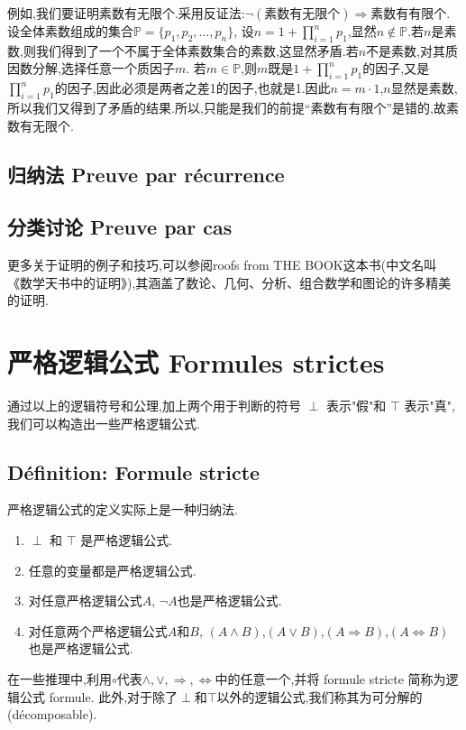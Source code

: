 \documentclass[12pt, a4paper, oneside]{ctexbook}
\newcommand{\n }{$n$}\newcommand{\f  }{$ f $}
\begin{document}
  
  例如,我们要证明素数有无限个.采用反证法:$\lnot(\text{素数有无限个})\Rightarrow \text{素数有有限个} $.设全体素数组成的集合$\mathbb{P}=\{p_1,p_2,\dots,p_n\}$,
  设$n=1+\prod _{i=1}^{n}p_1$,显然$n\notin \mathbb{P}$.若\n 是素数,则我们得到了一个不属于全体素数集合的素数,这显然矛盾.若\n 不是素数,对其质因数分解,选择任意一个质因子$m$.
  若$m\in \mathbb{P}$,则$m$既是$1+\prod _{i=1}^{n}p_1$的因子,又是$\prod _{i=1}^{n}p_1$的因子,因此必须是两者之差1的因子,也就是1.因此$n=m\cdot 1$,\n 显然是素数,
  所以我们又得到了矛盾的结果.所以,只能是我们的前提“素数有有限个”是错的,故素数有无限个.
  \subsection{归纳法 Preuve par récurrence}
  
  \subsection{分类讨论 Preuve par cas}



  
  更多关于证明的例子和技巧,可以参阅roofs from THE BOOK这本书(中文名叫《数学天书中的证明》),其涵盖了数论、几何、分析、组合数学和图论的许多精美的证明.

  \section{严格逻辑公式 Formules strictes}
  通过以上的逻辑符号和公理,加上两个用于判断的符号 $\perp $ 表示"假"和 $\top $ 表示"真",我们可以构造出一些严格逻辑公式.
  \subsection{Définition: Formule stricte}
  严格逻辑公式的定义实际上是一种归纳法.
  \begin{enumerate}
    \item $\perp $ 和 $\top $ 是严格逻辑公式.
    \item 任意的变量都是严格逻辑公式.
    \item 对任意严格逻辑公式$A$, $\lnot A$也是严格逻辑公式.
    \item 对任意两个严格逻辑公式$A$和$B$, $(A\land B)$,$(A\lor B)$,$(A\Rightarrow B)$,$(A\Leftrightarrow B)$也是严格逻辑公式.
  \end{enumerate}
  在一些推理中,利用$\circ$代表$\land,\lor,\Rightarrow,\Leftrightarrow$中的任意一个,并将 formule stricte 简称为逻辑公式 formule.
  此外,对于除了$\perp $和$\top $以外的逻辑公式,我们称其为可分解的(décomposable).
\end{document}
